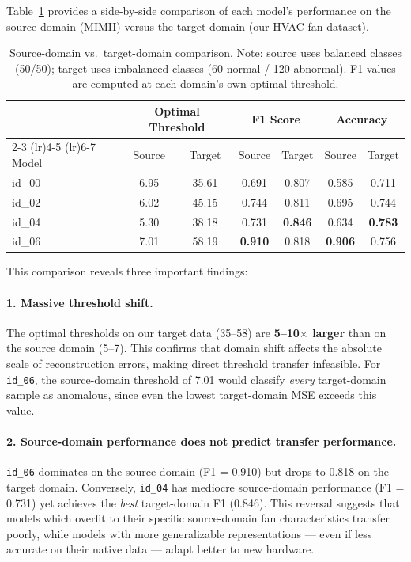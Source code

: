\documentclass[12pt, a4paper]{article}
\begin{document}
Table~\ref{tab:domain-comparison} provides a side-by-side comparison of each model's performance on the source domain (MIMII) versus the target domain (our HVAC fan dataset).

\begin{table}[htbp]
\centering
\caption{Source-domain vs.\ target-domain comparison. Note: source uses balanced classes (50/50); target uses imbalanced classes (60 normal / 120 abnormal). F1 values are computed at each domain's own optimal threshold.}
\label{tab:domain-comparison}
\begin{tabular}{l cc cc cc}
\toprule
 & \multicolumn{2}{c}{Optimal Threshold} & \multicolumn{2}{c}{F1 Score} & \multicolumn{2}{c}{Accuracy} \\
\cmidrule(lr){2-3} \cmidrule(lr){4-5} \cmidrule(lr){6-7}
Model & Source & Target & Source & Target & Source & Target \\
\midrule
id\_00 & 6.95 & 35.61 & 0.691 & 0.807 & 0.585 & 0.711 \\
id\_02 & 6.02 & 45.15 & 0.744 & 0.811 & 0.695 & 0.744 \\
id\_04 & 5.30 & 38.18 & 0.731 & \textbf{0.846} & 0.634 & \textbf{0.783} \\
id\_06 & 7.01 & 58.19 & \textbf{0.910} & 0.818 & \textbf{0.906} & 0.756 \\
\bottomrule
\end{tabular}
\end{table}

This comparison reveals three important findings:

\paragraph{1. Massive threshold shift.}
The optimal thresholds on our target data (35--58) are \textbf{5--10$\times$ larger} than on the source domain (5--7). This confirms that domain shift affects the absolute scale of reconstruction errors, making direct threshold transfer infeasible. For \texttt{id\_06}, the source-domain threshold of 7.01 would classify \emph{every} target-domain sample as anomalous, since even the lowest target-domain MSE exceeds this value.

\paragraph{2. Source-domain performance does not predict transfer performance.}
\texttt{id\_06} dominates on the source domain (F1 = 0.910) but drops to 0.818 on the target domain. Conversely, \texttt{id\_04} has mediocre source-domain performance (F1 = 0.731) yet achieves the \emph{best} target-domain F1 (0.846). This reversal suggests that models which overfit to their specific source-domain fan characteristics transfer poorly, while models with more generalizable representations --- even if less accurate on their native data --- adapt better to new hardware.
\end{document}
